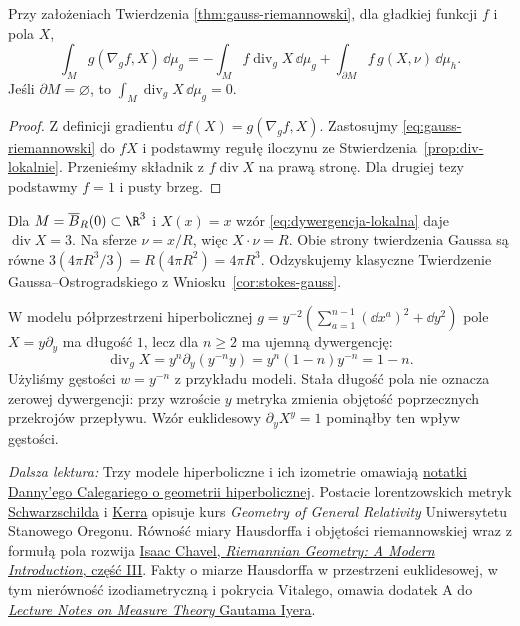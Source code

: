 \begin{wniosek}
\label{cor:riemann-calkowanie-przez-czesci}
Przy założeniach Twierdzenia
\ref{thm:gauss-riemannowski}, dla gładkiej
funkcji $f$ i pola $X$,
\[
 \int_M g(\nabla_gf,X)\,\dd\mu_g
 =-\int_M f\operatorname{div}_gX\,\dd\mu_g
   +\int_{\partial M}f\,g(X,\nu)\,\dd\mu_h.
\]
Jeśli $\partial M=\varnothing$, to
$\int_M\operatorname{div}_gX\,\dd\mu_g=0$.
\end{wniosek}
\begin{proof}
Z definicji gradientu $\dd f(X)=g(\nabla_gf,X)$.
Zastosujmy \eqref{eq:gauss-riemannowski}
do $fX$ i podstawmy regułę iloczynu
ze Stwierdzenia~\ref{prop:div-lokalnie}.
Przenieśmy składnik z $f\operatorname{div}X$
na prawą stronę. Dla drugiej tezy podstawmy
$f=1$ i pusty brzeg.
\end{proof}

\noindent\begin{minipage}{\linewidth}
\begin{przyklad}
Dla $M=\overline B_R(0)\subset\R^3$
i $X(x)=x$ wzór \eqref{eq:dywergencja-lokalna}
daje $\operatorname{div}X=3$.
Na sferze $\nu=x/R$, więc $X\cdot\nu=R$.
Obie strony twierdzenia Gaussa są równe
$3(4\pi R^3/3)=R(4\pi R^2)=4\pi R^3$.
Odzyskujemy klasyczne Twierdzenie
Gaussa--Ostrogradskiego
z Wniosku~\ref{cor:stokes-gauss}.

W modelu półprzestrzeni hiperbolicznej
$g=y^{-2}(\sum_{a=1}^{n-1}(\dd x^a)^2+\dd y^2)$
pole $X=y\partial_y$ ma długość $1$, lecz dla $n\geq2$
ma ujemną dywergencję:
\[
 \operatorname{div}_gX
 =y^n\partial_y(y^{-n}y)
 =y^n(1-n)y^{-n}=1-n.
\]
Użyliśmy gęstości $w=y^{-n}$ z przykładu modeli.
Stała długość pola nie oznacza zerowej dywergencji:
przy wzroście $y$ metryka zmienia objętość poprzecznych
przekrojów przepływu. Wzór euklidesowy $\partial_yX^y=1$
pominąłby ten wpływ gęstości.
\end{przyklad}

\par\smallskip
{\footnotesize\noindent\emph{Dalsza lektura:}
Trzy modele hiperboliczne i ich izometrie omawiają
\href{https://math.uchicago.edu/~dannyc/courses/kleinian_groups_2015/kleinian_groups.pdf}
{notatki Danny'ego Calegariego o geometrii hiperbolicznej}.
Postacie lorentzowskich metryk
\href{https://sites.science.oregonstate.edu/physics/coursewikis/GGR/_export/xhtml/book/ggr/schwarz.html}
{Schwarzschilda} i
\href{https://sites.science.oregonstate.edu/coursewikis/GGR/book/content/kerr}
{Kerra} opisuje kurs \emph{Geometry of General Relativity}
Uniwersytetu Stanowego Oregonu.
Równość miary Hausdorffa i objętości
riemannowskiej wraz z formułą pola rozwija
\href{https://doi.org/10.1017/CBO9780511616822.005}
{Isaac Chavel, \emph{Riemannian Geometry:
A Modern Introduction}, część III}.
Fakty o miarze Hausdorffa w przestrzeni euklidesowej,
w tym nierówność izodiametryczną i pokrycia Vitalego,
omawia dodatek A do
\href{https://www.math.cmu.edu/~gautam/sj/teaching/2022-23/720-measure/pdfs/measure.pdf}
{\emph{Lecture Notes on Measure Theory} Gautama Iyera}.\par}
\end{minipage}\par
